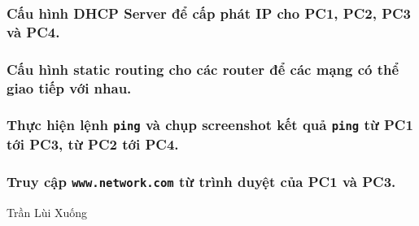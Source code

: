 \documentclass[]{article}
\begin{document}
\subsubsection{Cấu hình DHCP Server để cấp phát IP cho PC1, PC2, PC3 và PC4.}
\subsubsection{Cấu hình static routing cho các router để các mạng có thể giao tiếp với nhau.}
\subsubsection{Thực hiện lệnh \texttt{ping} và chụp screenshot kết quả \texttt{ping} từ PC1 tới PC3, từ PC2 tới PC4.}
\subsubsection{Truy cập \texttt{www.network.com} từ trình duyệt của PC1 và PC3.}

\begin{thebibliography}{10}
Trần Lùi Xuống
\end{thebibliography}
\end{document}
